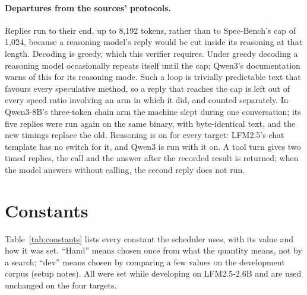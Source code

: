 \documentclass[10pt,twocolumn,letterpaper]{article}
\begin{document}
\paragraph{Departures from the sources' protocols.} Replies run to their end, up to 8,192 tokens, rather than to Spec-Bench's cap of 1,024, because a reasoning model's reply would be cut inside its reasoning at that length. Decoding is greedy, which this verifier requires. Under greedy decoding a reasoning model occasionally repeats itself until the cap; Qwen3's documentation warns of this for its reasoning mode. Such a loop is trivially predictable text that favours every speculative method, so a reply that reaches the cap is left out of every speed ratio involving an arm in which it did, and counted separately. In Qwen3-8B's three-token chain arm the machine slept during one conversation; its five replies were run again on the same binary, with byte-identical text, and the new timings replace the old. Reasoning is on for every target: LFM2.5's chat template has no switch for it, and Qwen3 is run with it on. A tool turn gives two timed replies, the call and the answer after the recorded result is returned; when the model answers without calling, the second reply does not run.

\section{Constants}\label{app:B}

Table~\ref{tab:constants} lists every constant the scheduler uses, with its value and how it was set. ``Hand'' means chosen once from what the quantity means, not by a search; ``dev'' means chosen by comparing a few values on the development corpus (setup notes). All were set while developing on LFM2.5-2.6B and are used unchanged on the four targets.
\end{document}
